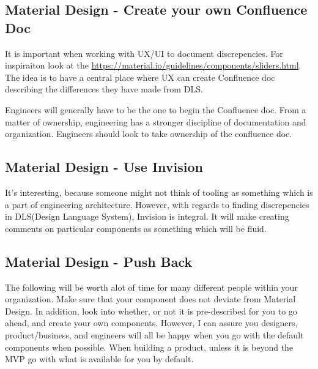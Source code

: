\subsection{ Material Design - Create your own Confluence Doc }

It is important when working with UX/UI to document discrepencies. For
inspiraiton look at the \href{material design docs}{https://material.io/guidelines/components/sliders.html}.
The idea is to have a central place where UX can create Confluence doc
describing the differences they have made from DLS.

Engineers will generally have to be the one to begin the Confluence doc. From a
matter of ownership, engineering has a stronger discipline of documentation and
organization. Engineers should look to take ownership of the confluence doc.

\subsection{ Material Design - Use Invision }
It's interesting, because someone might not think of tooling as something which
is a part of engineering architecture. However, with regards to finding
discrepencies in DLS(Design Language System), Invision is integral. It will
make creating comments on particular components as something which will be fluid.

\subsection{ Material Design - Push Back }
The following will be worth alot of time for many different people within your
organization. Make sure that your component does not deviate from Material
Design. In addition, look into whether, or not it is pre-described for you to
go ahead, and create your own components. However, I can assure you designers,
product/business, and engineers will all be happy when you go with the default
components when possible. When building a product, unless it is beyond the MVP
go with what is available for you by default. 
